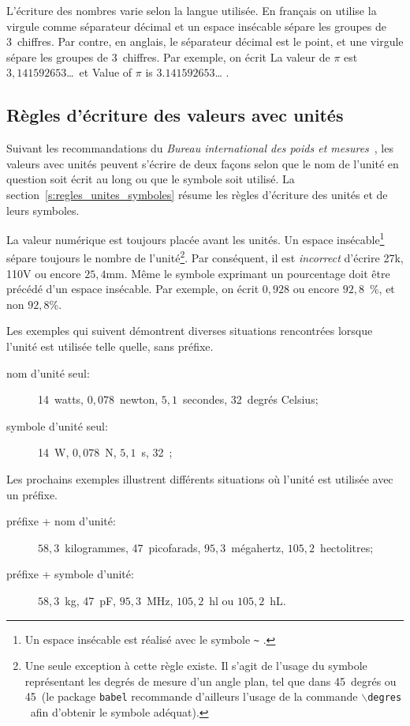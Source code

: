 L'écriture des nombres varie selon la langue utilisée. En français on utilise la virgule comme séparateur décimal et un espace insécable sépare les groupes de 3~chiffres. Par contre, en anglais, le séparateur décimal est le point, et une virgule sépare les groupes de 3~chiffres. Par exemple, on écrit \og La valeur de $\pi$ est $3,141592653$\ldots \fg\  et \og \foreignlanguage{USenglish}{Value of $\pi$ is $3.141592653$\ldots} \fg.

\subsection{Règles d'écriture des valeurs avec unités}

Suivant les recommandations du \emph{Bureau international des poids et mesures}~\cite{BIP98}, les valeurs avec unités peuvent s'écrire de deux façons selon que le nom de l'unité en question soit écrit au long ou que le symbole soit utilisé. La section~\ref{s:regles_unites_symboles} résume les règles d'écriture des unités et de leurs symboles.

La valeur numérique est toujours placée avant les unités. Un espace insécable\footnote{Un espace insécable est réalisé avec le symbole \og \texttt{\~} \fg.} sépare toujours le nombre de l'unité\footnote{Une seule exception à cette règle existe. Il s'agit de l'usage du symbole représentant les degrés de mesure d'un angle plan, tel que dans 45~degrés ou 45\degres\ (le package \texttt{babel} recommande d'ailleurs l'usage de la commande \og \texttt{$\backslash$degres} \fg\  afin d'obtenir le symbole adéquat).}. Par conséquent, il est \emph{incorrect} d'écrire 27k\textohm, 110V ou encore $25,4$mm. Même le symbole exprimant un pourcentage doit être précédé d'un espace insécable. Par exemple, on écrit $0,928$ ou encore $92,8$~\%, et non $92,8$\%.

Les exemples qui suivent démontrent diverses situations rencontrées lorsque l'unité est utilisée telle quelle, sans préfixe.
\begin{description}
  \item[nom d'unité seul:] 14~watts, $0,078$~newton, $5,1$~secondes, 32~degrés Celsius;
  \item[symbole d'unité seul:] 14~W, $0,078$~N, $5,1$~s, 32~\textcelsius;
\end{description}
Les prochains exemples illustrent différents situations où l'unité est utilisée avec un préfixe.
\begin{description}
  \item[préfixe + nom d'unité:] $58,3$~kilogrammes, 47~picofarads, $95,3$~mégahertz, $105,2$~hectolitres;
  \item[préfixe + symbole d'unité:] $58,3$~kg, 47~pF, $95,3$~MHz, $105,2$~hl ou $105,2$~hL.
\end{description}


